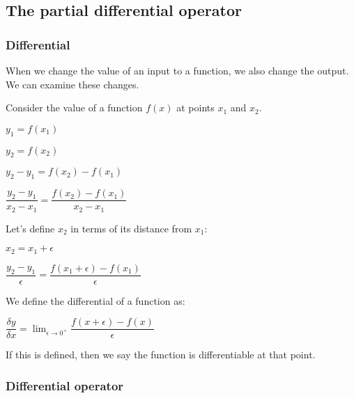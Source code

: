 
\subsection{The partial differential operator}

\subsubsection{Differential}

When we change the value of an input to a function, we also change the output. We can examine these changes.

Consider the value of a function \(f(x)\) at points \(x_1\) and \(x_2\).

\(y_1=f(x_1)\)

\(y_2=f(x_2)\)

\(y_2-y_1=f(x_2)-f(x_1)\)

\(\dfrac{y_2-y_1}{x_2-x_1}=\dfrac{f(x_2)-f(x_1)}{x_2-x_1}\)

Let's define \(x_2\) in terms of its distance from \(x_1\):

\(x_2=x_1+\epsilon\)

\(\dfrac{y_2-y_1}{\epsilon }=\dfrac{f(x_1+\epsilon )-f(x_1)}{\epsilon }\)

We define the differential of a function as:

\(\dfrac{\delta y}{\delta x}=\lim_{\epsilon \rightarrow 0^+}\dfrac{f(x+\epsilon )-f(x)}{\epsilon }\)

If this is defined, then we say the function is differentiable at that point.

\subsubsection{Differential operator}

